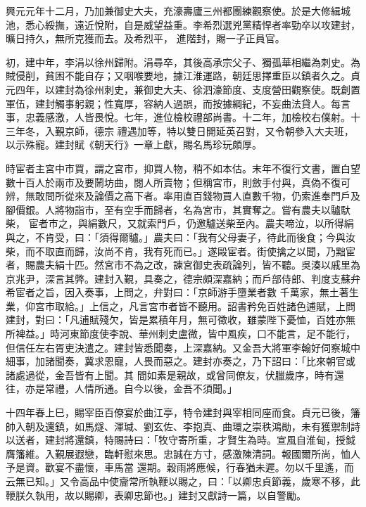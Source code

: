 \begin{pinyinscope}
 興元元年十二月，乃加兼御史大夫，充濠壽廬三州都團練觀察使。於是大修緝城池，悉心綏撫，遠近悅附，自是威望益重。李希烈選兇黨精悍者率勁卒以攻建封，曠日持久，無所克獲而去。及希烈平，
 進階封，賜一子正員官。



 初，建中年，李涓以徐州歸附。涓尋卒，其後高承宗父子、獨孤華相繼為刺史。為賊侵削，貧困不能自存；又咽喉要地，據江淮運路，朝廷思擇重臣以鎮者久之。貞元四年，以建封為徐州刺史，兼御史大夫、徐泗濠節度、支度營田觀察使。既創置軍伍，建封觸事躬親；性寬厚，容納人過誤，而按據綱紀，不妄曲法貸人。每言事，忠義感激，人皆畏悅。七年，進位檢校禮部尚書。十二年，加檢校右僕射。十三年冬，入覲京師，德宗
 禮遇加等，特以雙日開延英召對，又令朝參入大夫班，以示殊寵。建封賦《朝天行》一章上獻，賜名馬珍玩頗厚。



 時宦者主宮中市買，謂之宮市，抑買人物，稍不如本估。末年不復行文書，置白望數十百人於兩市及要鬧坊曲，閱人所賣物；但稱宮市，則斂手付與，真偽不復可辨，無敢問所從來及論價之高下者。率用直百錢物買人直數千物，仍索進奉門戶及腳價銀。人將物詣市，至有空手而歸者，名為宮市，其實奪之。嘗有農夫以驢馱柴，
 宦者市之，與絹數尺，又就索門戶，仍邀驢送柴至內。農夫啼泣，以所得絹與之，不肯受，曰：「須得爾驢。」農夫曰：「我有父母妻子，待此而後食；今與汝柴，而不取直而歸，汝尚不肯，我有死而已。」遂毆宦者。街使擒之以聞，乃黜宦者，賜農夫絹十匹。然宮市不為之改，諫宮御史表疏論列，皆不聽。吳湊以戚里為京兆尹，深言其弊。建封入覲，具奏之，德宗頗深嘉納；而戶部侍郎、判度支蘇弁希宦者之旨，因入奏事，上問之，弁對曰：「京師游手墮業者數
 千萬家，無土著生業，仰宮市取給。」上信之，凡言宮市者皆不聽用。詔書矜免百姓諸色逋賦，上問建封，對曰：「凡逋賦殘欠，皆是累積年月，無可徵收，雖蒙陛下憂恤，百姓亦無所裨益。」時河東節度使李說、華州刺史盧微，皆中風疾，口不能言，足不能行，但信任左右胥吏決遣之。建封皆悉聞奏，上深嘉納。又金吾大將軍李翰好伺察城中細事，加諸聞奏，冀求恩寵，人畏而惡之。建封亦奏之，乃下詔曰：「比來朝官或諸處過從，金吾皆有上聞。其
 間如素是親故，或曾同僚友，伏臘歲序，時有還往，亦是常禮，人情所通。自今以後，金吾不須聞。」



 十四年春上巳，賜宰臣百僚宴於曲江亭，特令建封與宰相同座而食。貞元已後，籓帥入朝及還鎮，如馬燧、渾瑊、劉玄佐、李抱真、曲環之崇秩鴻勛，未有獲禦制詩以送者，建封將還鎮，特賜詩曰：「牧守寄所重，才賢生為時。宣風自淮甸，授鉞膺籓維。入覲展遐戀，臨軒慰來思。忠誠在方寸，感激陳清詞。報國爾所尚，恤人予是資。歡宴不盡懷，車馬當
 還期。穀雨將應候，行春猶未遲。勿以千里遙，而云無已知。」又令高品中使齎常所執鞭以賜之，曰：「以卿忠貞節義，歲寒不移，此鞭朕久執用，故以賜卿，表卿忠節也。」建封又獻詩一篇，以自警勵。




\end{pinyinscope}
